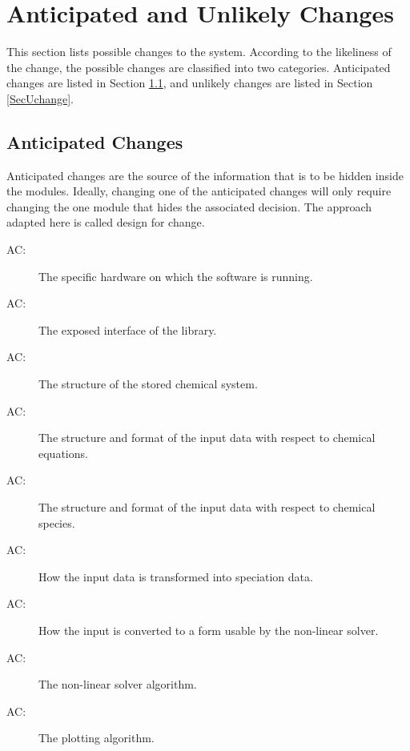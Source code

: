 \documentclass[12pt, titlepage]{article}
\newcounter{acnum}
\newcommand{\actheacnum}{AC\theacnum}
\begin{document}
\section{Anticipated and Unlikely Changes} \label{SecChange}

This section lists possible changes to the system. According to the likeliness
of the change, the possible changes are classified into two
categories. Anticipated changes are listed in Section \ref{SecAchange}, and
unlikely changes are listed in Section \ref{SecUchange}.

\subsection{Anticipated Changes} \label{SecAchange}

Anticipated changes are the source of the information that is to be hidden
inside the modules. Ideally, changing one of the anticipated changes will only
require changing the one module that hides the associated decision. The approach
adapted here is called design for
change.

\begin{description}
\item[ \actheacnum \label{acHardware}:] The specific
  hardware on which the software is running.
\item[ \actheacnum \label{acEI}:] The exposed interface 
  of the library.  
\item[ \actheacnum \label{acI}:] The structure of the stored
  chemical system.
\item[ \actheacnum \label{acIE}:] The structure and format of the
  input data with respect to chemical equations.  
\item[ \actheacnum \label{acIS}:] The structure and format of the
  input data with respect to chemical species.
\item[ \actheacnum \label{acC}:] How the input data is 
  transformed into speciation data.
\item[ \actheacnum \label{acIC}:] How the input is converted
  to a form usable by the non-linear solver.
\item[ \actheacnum \label{acNLS}:] The non-linear solver
  algorithm.
\item[ \actheacnum \label{acP}:] The plotting algorithm.
\end{description}
\end{document}
